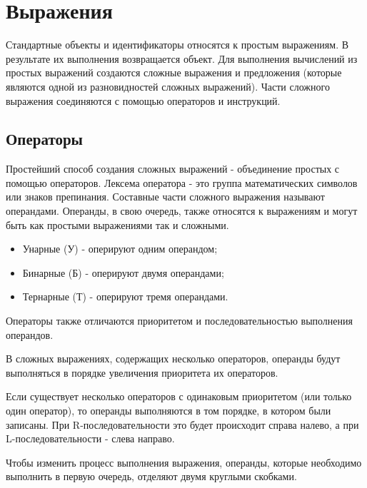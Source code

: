 \chapter{Выражения}

Стандартные объекты и идентификаторы относятся к простым выражениям. В результате их выполнения возвращается объект. Для выполнения вычислений из простых выражений создаются сложные выражения и предложения (которые являются одной из разновидностей сложных выражений). Части сложного выражения соединяются с помощью операторов и инструкций.

\section{Операторы}

Простейший способ создания сложных выражений - объединение простых с помощью операторов. Лексема оператора - это группа математических символов или знаков препинания. Составные части сложного выражения называют операндами. Операнды, в свою очередь, также относятся к выражениям и могут быть как простыми выражениями так и сложными.

\begin{itemize}
	\item Унарные (У) 	- оперируют одним операндом;
	\item Бинарные (Б) 	- оперируют двумя операндами;
	\item Тернарные (Т) - оперируют тремя операндами.
\end{itemize}

Операторы также отличаются приоритетом и последовательностью выполнения операндов. 

В сложных выражениях, содержащих несколько операторов, операнды будут выполняться в порядке увеличения приоритета их операторов.

Если существует несколько операторов с одинаковым приоритетом (или только один оператор), то операнды выполняются в том порядке, в котором были записаны. При R-последовательности это будет происходит справа налево, а при L-последовательности - слева направо.

Чтобы изменить процесс выполнения выражения, операнды, которые необходимо выполнить в первую очередь, отделяют двумя круглыми скобками.

